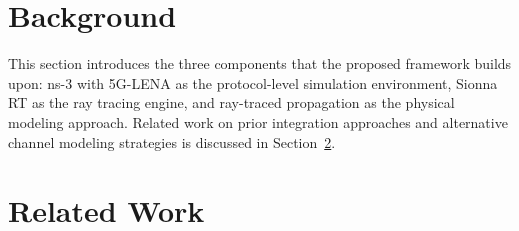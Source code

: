 \section{Background}
\label{sec:litreview}

This section introduces the three components that the proposed framework builds upon: ns-3 with 5G-LENA as the protocol-level simulation environment, Sionna RT as the ray tracing engine, and ray-traced propagation as the physical modeling approach.
Related work on prior integration approaches and alternative channel modeling strategies is discussed in Section~\ref{sec:relatedwork}.







\section{Related Work}
\label{sec:relatedwork}



